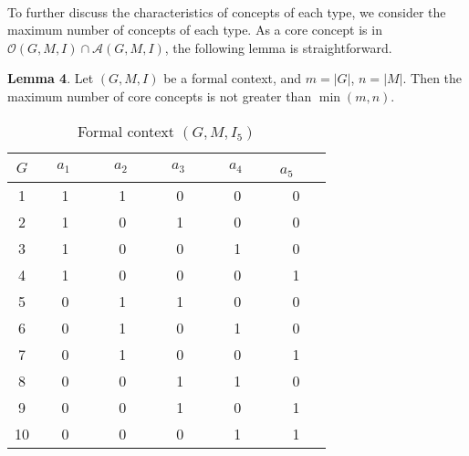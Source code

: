 \documentclass[11pt]{article}
\numberwithin{equation}{subsection}
\begin{document}
\



To further discuss the characteristics of concepts of each type, we consider the maximum number of concepts of each type. As a core concept is in $\mathcal{O}(G,M,I) \cap  \mathcal{A}(G,M,I)$, the following lemma is straightforward.

\textbf{ Lemma 4}. Let $(G, M, I)$ be a formal context, and $m= |G|$, $n=|M|$.  Then the maximum number of core concepts is not greater than
$\min(m,n)$.



 \begin{table*}[ht]
            \begin{center}
                \begin{normalsize}
                    \caption{Formal context $(G, M, I_5)$}
                    \label{table_tab05}
                    \begin{tabular}
                        {|c|c c  c  c  c|}
                        \hline
                        $G$     & $\ \ \ \ a_1\ \ \ \ \ $       &  $\ \ \ \ a_2\ \ \ \ \ $  &  $\ \ \ \ a_3\ \ \ \ \ $  & $\ \ \ \ a_4\ \ \ \ \ $  &  $\ \ a_5$\ \ \  \\
                       \hline
 1 & 1   & 1  &  0  & 0 &  0  \\

 2 & 1  &  0  & 1   &  0  &  0   \\

 3 & 1   & 0 &  0  &  1  &  0   \\

4 & 1 &  0  & 0    & 0   &   1  \\

5 & 0 &  1  &  1   &  0 &   0  \\

6 & 0 &  1  &   0  &  1 &   0  \\

7 & 0 &  1  &  0   &  0 &  1  \\

8 & 0 &  0  &  1 &  1 &  0  \\

9 & 0 &  0  &  1 &  0 &  1  \\

10 & 0 &  0  &  0 &  1 & 1  \\

\hline
                    \end{tabular}
                \end{normalsize}
            \end{center}
        \end{table*}
\end{document}
